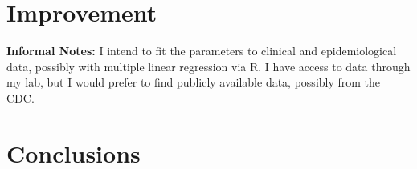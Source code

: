\documentclass[11pt]{article}
\begin{document}
\section*{Improvement}

\textbf{Informal Notes: }I intend to fit the parameters to clinical and epidemiological data, possibly with multiple linear regression via R. I have access to data through my lab, but I would prefer to find publicly available data, possibly from the CDC.

\section*{Conclusions}

\clearpage 

{\small

}
\end{document}
